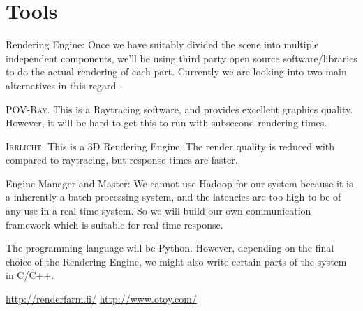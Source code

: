 \documentclass[10pt]{article}
\newenvironment{my_itemize}
{\begin{itemize}
  \setlength{\itemsep}{0pt}
  \setlength{\parskip}{0pt}
  \setlength{\parsep}{0pt}}
{\end{itemize}}
\begin{document}
\section{Tools}
\begin{my_itemize}
\item Rendering Engine: Once we have suitably divided the scene into multiple independent components, we'll be using third party open source software/libraries to do the actual rendering of each part. Currently we are looking into two main alternatives in this regard -
\begin{my_itemize}
\item \textsc{POV-Ray}. This is a Raytracing software, and provides excellent graphics quality. However, it will be hard to get this to run with subsecond rendering times.
\item \textsc{Irrlicht}. This is a 3D Rendering Engine. The render quality is reduced with compared to raytracing, but response times are faster.
\end{my_itemize}
\item Engine Manager and Master: We cannot use Hadoop for our system because it is a inherently a batch processing system, and the latencies are too high to be of any use in a real time system.  So we will build our own communication framework which is suitable for real time response.
\item The programming language will be Python. However, depending on the final choice of the Rendering Engine, we might also write certain parts of the system in C/C++.
\end{my_itemize}

\begin{thebibliography}{2}
 \url{http://renderfarm.fi/}
 \url{http://www.otoy.com/}
\end{thebibliography}
\end{document}
